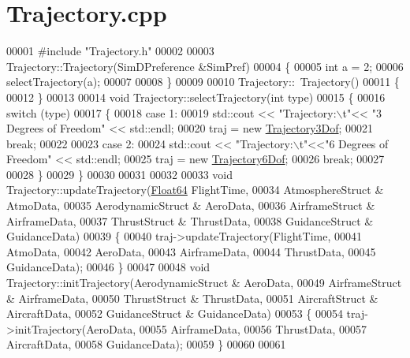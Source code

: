 \hypertarget{_trajectory_8cpp_source}{}\section{Trajectory.\+cpp}
\label{_trajectory_8cpp_source}

\begin{DoxyCode}
00001 \textcolor{preprocessor}{#include "Trajectory.h"}
00002 
00003 Trajectory::Trajectory(SimDPreference &SimPref)
00004 \{
00005     \textcolor{keywordtype}{int} a = 2;
00006     selectTrajectory(a);
00007 
00008 \}
00009 
00010 Trajectory::~Trajectory()
00011 \{
00012 \}
00013 
00014 \textcolor{keywordtype}{void} Trajectory::selectTrajectory(\textcolor{keywordtype}{int} type)
00015 \{
00016     \textcolor{keywordflow}{switch} (type)
00017     \{
00018     \textcolor{keywordflow}{case} 1:
00019         std::cout << \textcolor{stringliteral}{"Trajectory:\(\backslash\)t"}<< \textcolor{stringliteral}{"3 Degrees of Freedom"} << std::endl;
00020         traj = \textcolor{keyword}{new} \hyperlink{group___trajectory_class_trajectory3_dof}{Trajectory3Dof};
00021         \textcolor{keywordflow}{break};
00022 
00023     \textcolor{keywordflow}{case} 2:
00024         std::cout << \textcolor{stringliteral}{"Trajectory:\(\backslash\)t"}<<\textcolor{stringliteral}{"6 Degrees of Freedom"} << std::endl;
00025         traj = \textcolor{keyword}{new} \hyperlink{group___trajectory_class_trajectory6_dof}{Trajectory6Dof};
00026         \textcolor{keywordflow}{break};
00027 
00028     \}
00029 \}
00030 
00031 
00032 
00033 \textcolor{keywordtype}{void} Trajectory::updateTrajectory(\hyperlink{group___tools_ga3f1431cb9f76da10f59246d1d743dc2c}{Float64} FlightTime, 
00034                                   AtmosphereStruct & AtmoData, 
00035                                   AerodynamicStruct & AeroData, 
00036                                   AirframeStruct & AirframeData, 
00037                                   ThrustStruct & ThrustData,
00038                                   GuidanceStruct & GuidanceData)
00039 \{
00040     traj->updateTrajectory(FlightTime,
00041                            AtmoData,
00042                            AeroData, 
00043                            AirframeData, 
00044                            ThrustData,
00045                            GuidanceData);
00046 \}
00047 
00048 \textcolor{keywordtype}{void} Trajectory::initTrajectory(AerodynamicStruct & AeroData, 
00049                                 AirframeStruct & AirframeData, 
00050                                 ThrustStruct & ThrustData, 
00051                                 AircraftStruct & AircraftData,
00052                                 GuidanceStruct & GuidanceData)
00053 \{
00054     traj->initTrajectory(AeroData,
00055                         AirframeData,
00056                         ThrustData,
00057                         AircraftData,
00058                         GuidanceData);
00059 \}
00060 
00061 
\end{DoxyCode}
